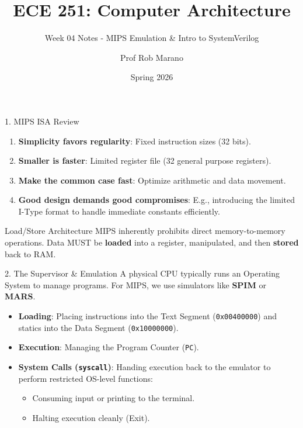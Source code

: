 \documentclass[aspectratio=169]{beamer}
\title{ECE 251: Computer Architecture}
\subtitle{Week 04 Notes - MIPS Emulation \& Intro to SystemVerilog}
\author{Prof Rob Marano}
\date{Spring 2026}
\begin{document}
\frame{\titlepage}

\begin{frame}{1. MIPS ISA Review}
\begin{enumerate}
    \item \textbf{Simplicity favors regularity}: Fixed instruction sizes (32 bits).
    \item \textbf{Smaller is faster}: Limited register file (32 general purpose registers).
    \item \textbf{Make the common case fast}: Optimize arithmetic and data movement.
    \item \textbf{Good design demands good compromises}: E.g., introducing the limited I-Type format to handle immediate constants efficiently.
\end{enumerate}
\vspace{0.2cm}
\begin{block}{Load/Store Architecture}
MIPS inherently prohibits direct memory-to-memory operations. Data MUST be \textbf{loaded} into a register, manipulated, and then \textbf{stored} back to RAM.
\end{block}
\end{frame}

\begin{frame}{2. The Supervisor \& Emulation}
A physical CPU typically runs an Operating System to manage programs. For MIPS, we use simulators like \textbf{SPIM} or \textbf{MARS}.
\vspace{0.2cm}
\begin{itemize}
    \item \textbf{Loading}: Placing instructions into the Text Segment (\texttt{0x00400000}) and statics into the Data Segment (\texttt{0x10000000}).
    \item \textbf{Execution}: Managing the Program Counter (\texttt{PC}).
    \item \textbf{System Calls (\texttt{syscall})}: Handing execution back to the emulator to perform restricted OS-level functions:
    \begin{itemize}
        \item Consuming input or printing to the terminal.
        \item Halting execution cleanly (Exit).
    \end{itemize}
\end{itemize}
\end{frame}
\end{document}
